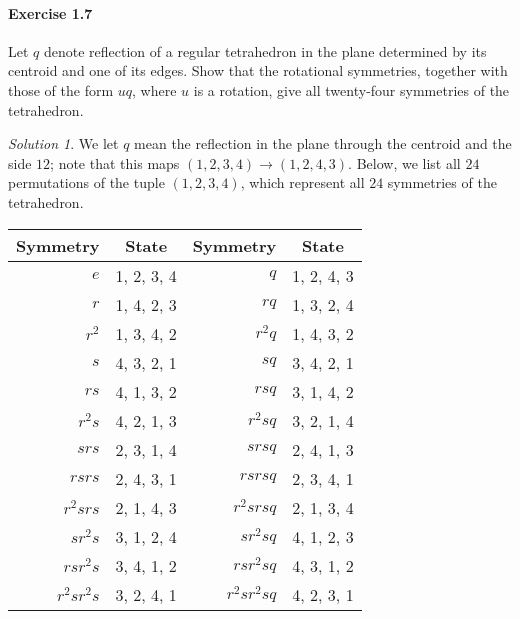 \documentclass[11pt]{report}
\theoremstyle{remark}
\newtheorem*{solution}{Solution}
\begin{document}
    \paragraph{Exercise 1.7} Let $q$ denote reflection of a regular tetrahedron in
    the plane determined by its centroid and one of its edges. Show that the
    rotational symmetries, together with those of the form $uq$, where $u$ is a
    rotation, give all twenty-four symmetries of the tetrahedron.
    \begin{solution}
        We let $q$ mean the reflection in the plane through the centroid and the
        side $12$; note that this maps $(1, 2, 3, 4) \to (1, 2, 4, 3)$.
        Below, we list all $24$ permutations of the tuple $(1, 2, 3, 4)$, which
        represent all $24$ symmetries of the tetrahedron.
        \begin{center}
        \begin{tabular}{r|c||r|c}
            Symmetry    & State         & Symmetry      & State         \\\hline
            $e$         & 1, 2, 3, 4    & $q$           & 1, 2, 4, 3 \\
            $r$         & 1, 4, 2, 3    & $rq$          & 1, 3, 2, 4 \\
            $r^2$       & 1, 3, 4, 2    & $r^2q$        & 1, 4, 3, 2 \\
            $s$         & 4, 3, 2, 1    & $sq$          & 3, 4, 2, 1 \\
            $rs$        & 4, 1, 3, 2    & $rsq$         & 3, 1, 4, 2 \\
            $r^2s$      & 4, 2, 1, 3    & $r^2sq$       & 3, 2, 1, 4 \\
            $srs$       & 2, 3, 1, 4    & $srsq$        & 2, 4, 1, 3 \\
            $rsrs$      & 2, 4, 3, 1    & $rsrsq$       & 2, 3, 4, 1 \\
            $r^2srs$    & 2, 1, 4, 3    & $r^2srsq$     & 2, 1, 3, 4 \\
            $sr^2s$     & 3, 1, 2, 4    & $sr^2sq$      & 4, 1, 2, 3 \\
            $rsr^2s$    & 3, 4, 1, 2    & $rsr^2sq$     & 4, 3, 1, 2 \\
            $r^2sr^2s$  & 3, 2, 4, 1    & $r^2sr^2sq$   & 4, 2, 3, 1
        \end{tabular}
        \end{center}
    \end{solution}
\end{document}
